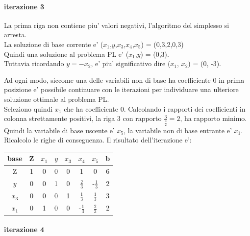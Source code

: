 \documentclass[a4paper,12pt,oneside]{article}
\begin{document}
    \paragraph{iterazione 3}
    
    La prima riga non contiene piu' valori negativi, l'algoritmo del simplesso si arresta. \\
    La soluzione di base corrente e' ($x_1$,$y$,$x_3$,$x_4$,$x_5$) = (0,3,2,0,3) \\
    Quindi una soluzione al problema PL e' ($x_1$,$y$) = (0,3). \\
    Tuttavia ricordando $y = -x_2$, e' piu' significativo dire ($x_1$, $x_2$) = (0, -3).
    
    Ad ogni modo, siccome una delle variabili non di base ha coefficiente 0 in prima posizione e' possibile continuare con le iterazioni per individuare una ulteriore soluzione ottimale al problema PL. \\

    Seleziono quindi $x_1$ che ha coefficiente 0.
    Calcolando i rapporti dei coefficienti in colonna strettamente positivi, la riga 3 con rapporto $\frac 3 {\frac 3 2} = 2$, ha rapporto minimo.
    Quindi la variabile di base uscente e' $x_5$, la variabile non di base entrante e' $x_1$.
    Ricalcolo le righe di conseguenza. Il risultato dell'iterazione e':

    \begin{center}
        \begin{tabular}{||c c c c c c c c||}
            \hline
            base & Z & $x_1$ & $y$ & $x_3$ & $x_4$ & $x_5$ & b \\
            \hline
            \hline
            Z     & 1 & 0 & 0 & 0 &            1 &            0 &  6 \\
            \hline
            $y$   & 0 & 0 & 1 & 0 &  $\frac 2 3$ & -$\frac 1 3$ &  2 \\
            \hline
            $x_3$ & 0 & 0 & 0 & 1 &  $\frac 1 3$ &  $\frac 1 3$ &  3 \\
            \hline
            $x_1$ & 0 & 1 & 0 & 0 & -$\frac 1 3$ &  $\frac 2 3$ &  2 \\
            \hline
        \end{tabular}
    \end{center}

    \paragraph{iterazione 4}
\end{document}
